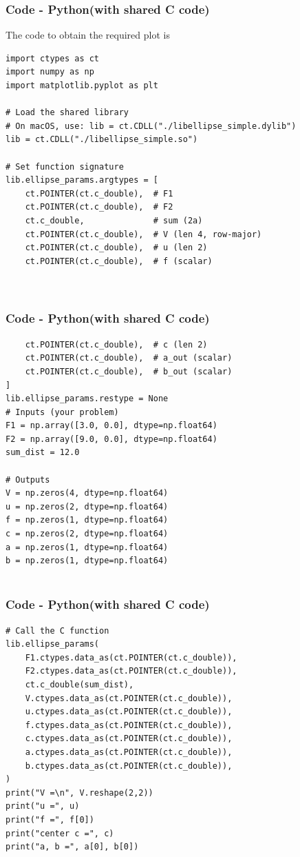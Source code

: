 \documentclass{beamer}
\theoremstyle{remark}
\numberwithin{equation}{section}
\begin{document}
\begin{frame}[fragile]
    \frametitle{Code - Python(with shared C code)}
    The code to obtain the required plot is
    \begin{lstlisting}
import ctypes as ct
import numpy as np
import matplotlib.pyplot as plt

# Load the shared library
# On macOS, use: lib = ct.CDLL("./libellipse_simple.dylib")
lib = ct.CDLL("./libellipse_simple.so")

# Set function signature
lib.ellipse_params.argtypes = [
    ct.POINTER(ct.c_double),  # F1
    ct.POINTER(ct.c_double),  # F2
    ct.c_double,              # sum (2a)
    ct.POINTER(ct.c_double),  # V (len 4, row-major)
    ct.POINTER(ct.c_double),  # u (len 2)
    ct.POINTER(ct.c_double),  # f (scalar)



\end{lstlisting}
\end{frame}
\begin{frame}[fragile]
\frametitle{Code - Python(with shared C code)}
\begin{lstlisting}
    ct.POINTER(ct.c_double),  # c (len 2)
    ct.POINTER(ct.c_double),  # a_out (scalar)
    ct.POINTER(ct.c_double),  # b_out (scalar)
]
lib.ellipse_params.restype = None
# Inputs (your problem)
F1 = np.array([3.0, 0.0], dtype=np.float64)
F2 = np.array([9.0, 0.0], dtype=np.float64)
sum_dist = 12.0

# Outputs
V = np.zeros(4, dtype=np.float64)
u = np.zeros(2, dtype=np.float64)
f = np.zeros(1, dtype=np.float64)
c = np.zeros(2, dtype=np.float64)
a = np.zeros(1, dtype=np.float64)
b = np.zeros(1, dtype=np.float64)


\end{lstlisting}
\end{frame}

\begin{frame}[fragile]
\frametitle{Code - Python(with shared C code)}
\begin{lstlisting}
# Call the C function
lib.ellipse_params(
    F1.ctypes.data_as(ct.POINTER(ct.c_double)),
    F2.ctypes.data_as(ct.POINTER(ct.c_double)),
    ct.c_double(sum_dist),
    V.ctypes.data_as(ct.POINTER(ct.c_double)),
    u.ctypes.data_as(ct.POINTER(ct.c_double)),
    f.ctypes.data_as(ct.POINTER(ct.c_double)),
    c.ctypes.data_as(ct.POINTER(ct.c_double)),
    a.ctypes.data_as(ct.POINTER(ct.c_double)),
    b.ctypes.data_as(ct.POINTER(ct.c_double)),
)
print("V =\n", V.reshape(2,2))
print("u =", u)
print("f =", f[0])
print("center c =", c)
print("a, b =", a[0], b[0])


\end{lstlisting}
\end{frame}
\end{document}
